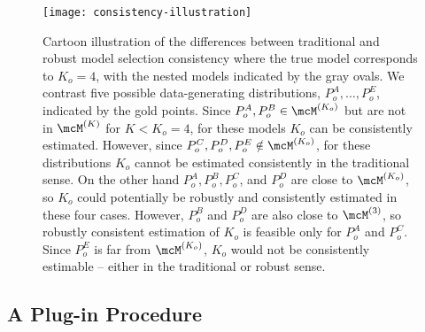 \begin{figure}[tp]
	\centering
	\texttt{[image: consistency-illustration]}
	\caption{Cartoon illustration of the differences between traditional and robust model selection consistency
		where the true model corresponds to $K_{o} = 4$, with the nested models indicated by the gray ovals.
		We contrast five possible data-generating distributions, $P_{o}^{A}, \dots, P_{o}^{E}$, indicated by
		the gold points.
		Since $P_{o}^{A}, P_{o}^{B} \in \model{K_{o}}$ but are not in $\model{K}$ for $K < K_o = 4$,
		for these models $K_{o}$ can be consistently estimated.
		However,  since $P_{o}^{C}, P_{o}^{D}, P_{o}^{E} \notin \model{K_{o}}$, for these distributions
		$K_{o}$ cannot be estimated consistently in the traditional sense.
		On the other hand $P_{o}^{A}, P_{o}^{B}, P_{o}^{C}$, and $P_{o}^{D}$
		are close to $\model{K_{o}}$,
		so $K_{o}$ could potentially be robustly and consistently estimated in these four cases.
		However, $P_{o}^{B}$ and $P_{o}^{D}$ are also close to $\model{3}$, so robustly consistent
		estimation of $K_{o}$ is feasible only for $P_{o}^{A}$ and $P_{o}^{C}$.
		Since $P_{o}^{E}$ is far from $\model{K_{o}}$, $K_{o}$ would not be consistently estimable --
		either in the traditional or robust sense.
	}
	\label{fig:consistency-illustration}
\end{figure}




\subsection{A Plug-in Procedure}
\label{sec:method}

